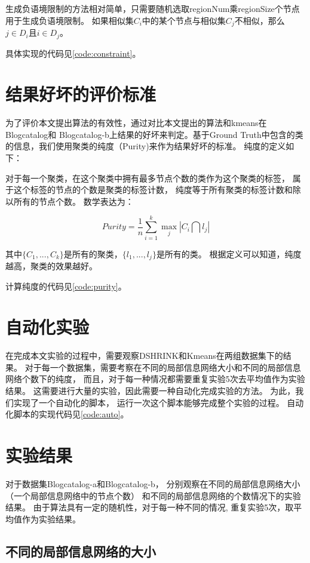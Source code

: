生成负语境限制的方法相对简单，只需要随机选取regionNum乘regionSize个节点用于生成负语境限制。
如果相似集$C_i$中的某个节点与相似集$C_j$不相似，那么$j \in D_i$且$i \in D_j$。

具体实现的代码见\ref{code:constraint}。

\section{结果好坏的评价标准}

为了评价本文提出算法的有效性，通过对比本文提出的算法和kmeans在Blogcatalog和
Blogcatalog-b上结果的好坏来判定。基于Ground Truth中包含的类的信息，我们使用聚类的纯度（Purity)来作为结果好坏的标准。
纯度的定义如下：

对于每一个聚类，在这个聚类中拥有最多节点个数的类作为这个聚类的标签，
属于这个标签的节点的个数是聚类的标签计数，
纯度等于所有聚类的标签计数和除以所有的节点个数。
数学表达为：

\begin{equation}
\label{equa:purity}
Purity = \frac{1}{n} \sum_{i=1}^k \operatorname{max}_j |C_i \bigcap l_j|
\end{equation}

其中$\{C_1, ..., C_k\}$是所有的聚类，$\{l_1, ..., l_j\}$是所有的类。
根据定义可以知道，纯度越高，聚类的效果越好。

计算纯度的代码见\ref{code:purity}。


\section{自动化实验}

在完成本文实验的过程中，需要观察DSHRINK和Kmeans在两组数据集下的结果。
对于每一个数据集，需要考察在不同的局部信息网络大小和不同的局部信息网络个数下的纯度，
而且，对于每一种情况都需要重复实验5次去平均值作为实验结果。
这需要进行大量的实验，因此需要一种自动化完成实验的方法。
为此，我们实现了一个自动化的脚本，
运行一次这个脚本能够完成整个实验的过程。
自动化脚本的实现代码见\ref{code:auto}。

\section{实验结果}
\label{sec:results}
对于数据集Blogcatalog-a和Blogcatalog-b，
分别观察在不同的局部信息网络大小（一个局部信息网络中的节点个数）
和不同的局部信息网络的个数情况下的实验结果。
由于算法具有一定的随机性，对于每一种不同的情况,
重复实验5次，取平均值作为实验结果。

\subsection{不同的局部信息网络的大小}
\label{sec:results_node_max}

